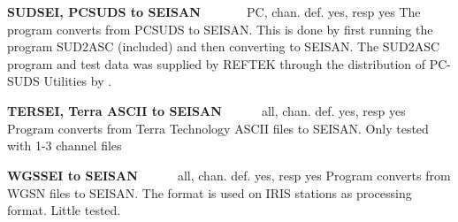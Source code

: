\textbf{SUDSEI, PCSUDS to SEISAN} \verb|      | PC, chan. def. yes, resp yes\newline
{}
The program converts from PCSUDS to SEISAN. This is done by first running the program SUD2ASC (included) and then converting to 
SEISAN. The SUD2ASC program and test data was supplied by REFTEK through the distribution of PC-SUDS Utilities by \citet{banfill1996}.  

\textbf{TERSEI, Terra ASCII to SEISAN} \verb|     | all, chan. def. yes, resp yes \newline
{}
Program converts from Terra Technology ASCII files to SEISAN. Only tested with 1-3 channel files 

\textbf{WGSSEI to SEISAN} \verb|     | all, chan. def. yes, resp yes \newline
{}
Program converts from WGSN files to SEISAN. The format is used on IRIS stations as processing format. Little tested. 

